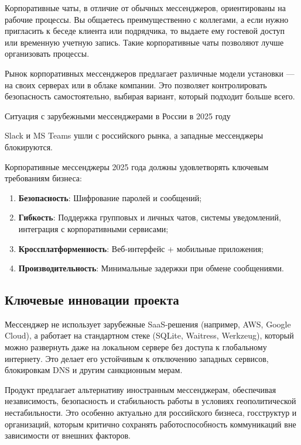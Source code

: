 Корпоративные чаты, в отличие от обычных мессенджеров, ориентированы на рабочие процессы. Вы общаетесь преимущественно с коллегами, а если нужно пригласить к беседе клиента или подрядчика, то выдаете ему гостевой доступ или временную учетную запись. Такие корпоративные чаты позволяют лучше организовать процессы.

Рынок корпоративных мессенджеров предлагает различные модели установки — на своих серверах или в облаке компании. Это позволяет контролировать безопасность самостоятельно, выбирая вариант, который подходит больше всего.

Ситуация с зарубежными мессенджерами в России в 2025 году

Slack и MS Teams ушли с российского рынка, а западные мессенджеры блокируются.

Корпоративные мессенджеры 2025 года должны удовлетворять ключевым требованиям бизнеса:

\begin{enumerate}
	\item \textbf{Безопасность}: Шифрование паролей и сообщений;
	\item \textbf{Гибкость}: Поддержка групповых и личных чатов, системы уведомлений, интеграция с корпоративными сервисами;
	\item \textbf{Кроссплатформенность}: Веб-интерфейс + мобильные приложения;
	\item \textbf{Производительность}: Минимальные задержки при обмене сообщениями.
\end{enumerate}

\subsection{Ключевые инновации проекта}

Мессенджер не использует зарубежные SaaS-решения (например, AWS, Google Cloud), а работает на стандартном стеке (SQLite, Waitress, Werkzeug), который можно развернуть даже на локальном сервере без доступа к глобальному интернету. Это делает его устойчивым к отключению западных сервисов, блокировкам DNS и другим санкционным мерам.

Продукт предлагает альтернативу иностранным мессенджерам, обеспечивая независимость, безопасность и стабильность работы в условиях геополитической нестабильности. Это особенно актуально для российского бизнеса, госструктур и организаций, которым критично сохранять работоспособность коммуникаций вне зависимости от внешних факторов.
		

